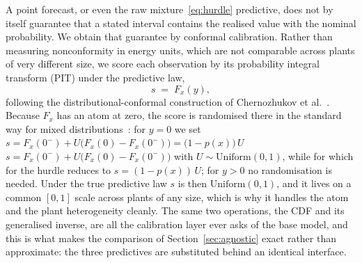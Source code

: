 \documentclass[preprint,3p,times]{elsarticle}
\providecommand{\DIFaddtex}[1]{{\protect\color{blue} \sf #1}} %
\providecommand{\DIFdeltex}[1]{{\protect\color{red} \scriptsize #1}} %
\providecommand{\DIFaddbegin}{} %
\providecommand{\DIFaddend}{} %
\providecommand{\DIFdelbegin}{} %
\providecommand{\DIFdelend}{} %
\providecommand{\DIFadd}[1]{\texorpdfstring{\DIFaddtex{#1}}{#1}} %
\providecommand{\DIFdel}[1]{\texorpdfstring{\DIFdeltex{#1}}{}} %
\begin{document}
A point forecast, or even the raw \DIFdelbegin \DIFdel{mixture~\eqref{eq:hurdle}}\DIFdelend \DIFaddbegin \DIFadd{predictive}\DIFaddend , does not by itself guarantee that a stated interval contains the realised value with the nominal probability. We obtain that guarantee by conformal calibration. Rather than measuring nonconformity in energy units, which are not comparable across plants of very different size, we score each observation by its probability integral transform \DIFdelbegin \DIFdel{(PIT) }\DIFdelend under the predictive law,
\begin{equation}
s \;=\; F_x(y),
\label{eq:pit}
\end{equation}
following the distributional-conformal construction of Chernozhukov et al.~\cite{chernozhukov2021}. Because $F_x$ has an atom at zero, the score is randomised there in the standard way for mixed distributions~\cite{smith1985}: for $y=0$ we set \DIFdelbegin \DIFdel{$s=F_x(0^-)+U\big(F_x(0)-F_x(0^-)\big)=\big(1-p(x)\big)\,U$ }\DIFdelend \DIFaddbegin \DIFadd{$s=F_x(0^-)+U\big(F_x(0)-F_x(0^-)\big)$ }\DIFaddend with $U\sim\mathrm{Uniform}(0,1)$, \DIFdelbegin \DIFdel{while for }\DIFdelend \DIFaddbegin \DIFadd{which for the hurdle reduces to $s=(1-p(x))\,U$; for }\DIFaddend $y>0$ no randomisation is needed. Under the true predictive law $s$ is then $\mathrm{Uniform}(0,1)$, and it lives on a common $[0,1]$ scale across plants of any size, which is why it handles the atom and the plant heterogeneity cleanly. \DIFaddbegin \DIFadd{The same two operations, the CDF and its generalised inverse, are all the calibration layer ever asks of the base model, and this is what makes the comparison of Section~\ref{sec:agnostic} exact rather than approximate: the three predictives are substituted behind an identical interface.
}\DIFaddend 
\end{document}
